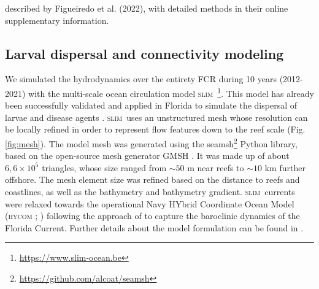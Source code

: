 \documentclass[preprint,12pt,authoryear]{elsarticle}
\newcommand{\hycom}{\textsc{hycom} }
\newcommand{\slim}{\textsc{slim}\ }
\begin{document}
described by Figueiredo et al. (2022), with detailed methods in their online supplementary information.

\subsection*{Larval dispersal and connectivity modeling}

We simulated the hydrodynamics over the entirety FCR during 10 years (2012-2021) with the multi-scale ocean circulation model \slim\footnote{\href{ https://www.slim-ocean.be}{https://www.slim-ocean.be}}. This model has already been successfully validated and applied in Florida to simulate the dispersal of larvae and disease agents \citep{frys2020fine,dobbelaere2020coupled,dobbelaere2022connecting}. \slim uses an unstructured mesh whose resolution can be locally refined in order to represent flow features down to the reef scale (Fig. \ref{fig:mesh}). The model mesh was generated using the seamsh\footnote{\href{https://github.com/alcoat/seamsh}{https://github.com/alcoat/seamsh}} Python library, based on the open-source mesh generator GMSH \citep{geuzaine2009gmsh}. It was made up of about $6,6\times 10^5$ triangles, whose size ranged from $\sim 50$ m near reefs to $\sim 10$ km further offshore. The mesh element size was refined based on the distance to reefs and coastlines, as well as the bathymetry and bathymetry gradient. \slim currents were relaxed towards the operational Navy HYbrid Coordinate Ocean Model (\hycom; \citealp{chassignet2007hycom}) following the approach of \citep{dobbelaere2022impacts} to capture the baroclinic dynamics of the Florida Current. Further details about the model formulation can be found in \citep{frys2020fine}.
\end{document}
